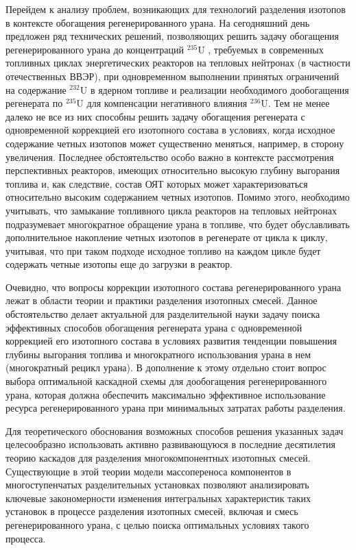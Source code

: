 Перейдем к анализу проблем, возникающих для технологий разделения изотопов в контексте обогащения регенерированного урана. На сегодняшний день предложен ряд технических решений, позволяющих решить задачу обогащения регенерированного урана до концентраций $^{235}$U , требуемых в современных топливных циклах энергетических реакторов на тепловых нейтронах (в частности отечественных ВВЭР), при одновременном выполнении принятых ограничений на содержание $^{232}$U в ядерном топливе и реализации необходимого дообогащения регенерата по $^{235}$U для компенсации негативного влияния $^{236}$U. Тем не менее далеко не все из них способны решить задачу обогащения регенерата с одновременной коррекцией его изотопного состава в условиях, когда исходное содержание четных изотопов может существенно меняться, например, в сторону увеличения. Последнее обстоятельство особо важно в контексте рассмотрения перспективных реакторов, имеющих относительно высокую глубину выгорания топлива и, как следствие, состав ОЯТ которых может характеризоваться относительно высоким содержанием четных изотопов. Помимо этого, необходимо учитывать, что замыкание топливного цикла реакторов на тепловых нейтронах подразумевает многократное обращение урана в топливе, что будет обуславливать дополнительное накопление четных изотопов в регенерате от цикла к циклу, учитывая, что при таком подходе исходное топливо на каждом цикле будет содержать четные изотопы еще до загрузки в реактор.

Очевидно, что вопросы коррекции изотопного состава регенерированного урана лежат в области теории и практики разделения изотопных смесей. Данное обстоятельство делает актуальной для разделительной науки задачу поиска эффективных способов обогащения регенерата урана с одновременной коррекцией его изотопного состава в условиях развития тенденции повышения глубины выгорания топлива и многократного использования урана в нем (многократный рецикл урана). В дополнение к этому отдельно стоит вопрос выбора оптимальной каскадной схемы для дообогащения регенерированного урана, которая должна обеспечить максимально эффективное использование ресурса регенерированного урана при минимальных затратах работы разделения.

Для теоретического обоснования возможных способов решения указанных задач целесообразно использовать активно развивающуюся в последние десятилетия теорию каскадов для разделения многокомпонентных изотопных смесей. Существующие в этой теории модели массопереноса компонентов в многоступенчатых разделительных установках позволяют анализировать ключевые закономерности изменения интегральных характеристик таких установок в процессе разделения изотопных смесей, включая и смесь регенерированного урана, с целью поиска оптимальных условиях такого процесса.
 

